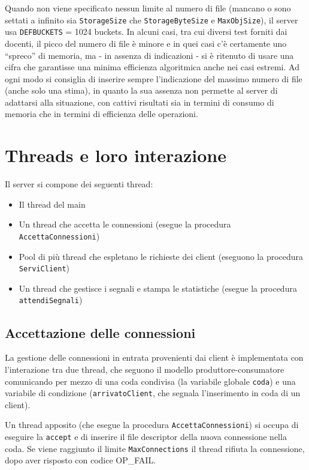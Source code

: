 \documentclass[a4paper,12pt]{article}
\begin{document}
Quando non viene specificato nessun limite al numero di file (mancano o sono settati a infinito sia \texttt{StorageSize} che \texttt{StorageByteSize} e \texttt{MaxObjSize}), il server usa \texttt{DEFBUCKETS} = 1024 buckets. In alcuni casi, tra cui diversi test forniti dai docenti, il picco del numero di file è minore e in quei casi c'è certamente uno ``spreco'' di memoria, ma - in assenza di indicazioni - si è ritenuto di usare una cifra che garantisse una minima efficienza algoritmica anche nei casi estremi. Ad ogni modo si consiglia di inserire sempre l'indicazione del massimo numero di file (anche solo una stima), in quanto la sua assenza non permette al server di adattarsi alla situazione, con cattivi risultati sia in termini di consumo di memoria che in termini di efficienza delle operazioni.

\section{ Threads e loro interazione }

Il server si compone dei seguenti thread:
\begin{itemize}
 \item Il thread del main
 \item Un thread che accetta le connessioni (esegue la procedura \texttt{AccettaConnessioni})
 \item Pool di più thread che espletano le richieste dei client (eseguono la procedura \texttt{ServiClient})
 \item Un thread che gestisce i segnali e stampa le statistiche (esegue la procedura \texttt{attendiSegnali})
\end{itemize}

\subsection{ Accettazione delle connessioni }

La gestione delle connessioni in entrata provenienti dai client è implementata con l'interazione tra due thread, che seguono il modello produttore-consumatore comunicando per mezzo di una coda condivisa (la variabile globale \texttt{coda}) e una variabile di condizione (\texttt{arrivatoClient}, che segnala l'inserimento in coda di un client).

Un thread apposito (che esegue la procedura \texttt{AccettaConnessioni}) si occupa di eseguire la \texttt{accept} e di inserire il file descriptor della nuova connessione nella coda. Se viene raggiunto il limite \texttt{MaxConnections} il thread rifiuta la connessione, dopo aver risposto con codice OP\_FAIL.
\end{document}
